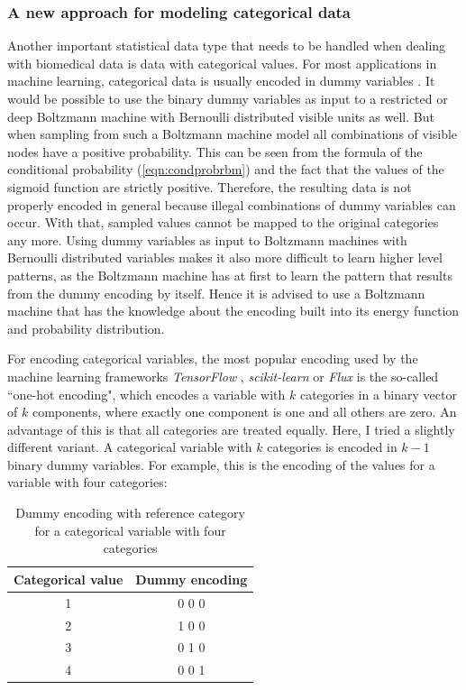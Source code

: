 \documentclass[12pt]{article}
\newcommand{\apkg}[1]{\emph{#1}}
\begin{document}
\subsubsection{A new approach for modeling categorical data}\label{methodsoftmax0}
Another important statistical data type that needs to be handled when dealing with biomedical data is data with categorical values.
For most applications in machine learning, categorical data is usually encoded in dummy variables \citep{hastie_elements}.
It would be possible to use the binary dummy variables as input to a restricted or deep Boltzmann machine with Bernoulli distributed visible units as well.
But when sampling from such a Boltzmann machine model all combinations of visible nodes have a positive probability. This can be seen from the formula of the conditional probability (\ref{eqn:condprobrbm}) and the fact that the values of the sigmoid function are strictly positive.
Therefore, the resulting data is not properly encoded in general  because illegal combinations of dummy variables can occur. With that, sampled values cannot be mapped to the original categories any more.
Using dummy variables as input to Boltzmann machines with Bernoulli distributed variables makes it also more difficult to learn higher level patterns, as the Boltzmann machine has at first to learn the pattern that results from the dummy encoding  by itself. Hence it is advised to use a Boltzmann machine that has the knowledge about the encoding built into its energy function and probability distribution.


For encoding categorical variables, the most popular encoding used by the machine learning frameworks \apkg{TensorFlow} \citep{tensorflow}, \apkg{scikit-learn} \citep{scikit-learn} or \apkg{Flux} \citep{flux} is the so-called ``one-hot encoding", which encodes a variable with $k$ categories in a binary vector of $k$ components, where exactly one component is one and all others are zero.
An advantage of this is that all categories are treated equally.
Here, I tried a slightly different variant.
A categorical variable with $k$ categories is encoded in $k-1$ binary dummy variables.
For example, this is the encoding of the values for a variable with four categories:

\begin{table}[h!]
\centering
\begin{tabular}{cc}
Categorical value & Dummy encoding \\
\hline
1 & 0 0 0 \\
2 & 1 0 0 \\
3 & 0 1 0 \\
4 & 0 0 1 \\
\end{tabular}
\caption{Dummy encoding with reference category for a categorical variable with four categories}\label{dummenc}
\end{table}
\end{document}
